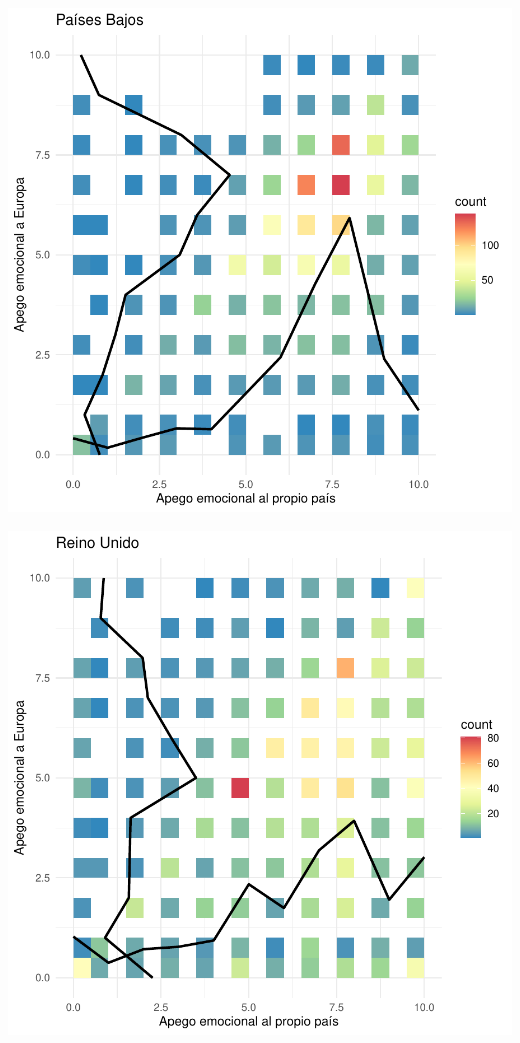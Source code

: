 \documentclass{article}
\begin{document}
\includegraphics{Informe-022}

\includegraphics{Informe-023}
\end{document}
